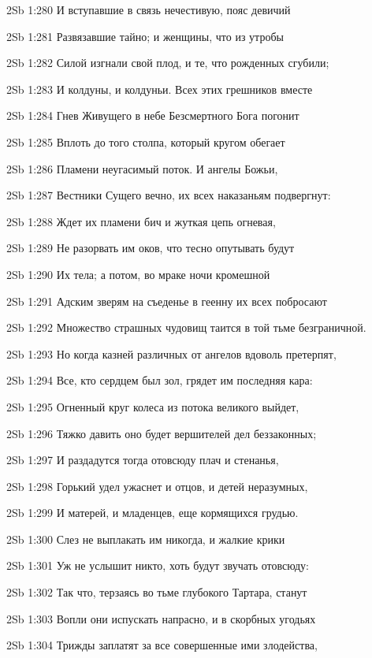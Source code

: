 \vs 2Sb 1:280 И вступавшие в связь нечестивую, пояс девичий 

\vs 2Sb 1:281 Развязавшие тайно; и женщины, что из утробы 

\vs 2Sb 1:282 Силой изгнали свой плод, и те, что рожденных сгубили; 

\vs 2Sb 1:283 И колдуны, и колдуньи. Всех этих грешников вместе 

\vs 2Sb 1:284 Гнев Живущего в небе Безсмертного Бога погонит

\vs 2Sb 1:285 Вплоть до того столпа, который кругом обегает 

\vs 2Sb 1:286 Пламени неугасимый поток. И ангелы Божьи, 

\vs 2Sb 1:287 Вестники Сущего вечно, их всех наказаньям подвергнут: 

\vs 2Sb 1:288 Ждет их пламени бич и жуткая цепь огневая,

\vs 2Sb 1:289 Не разорвать им оков, что тесно опутывать будут

\vs 2Sb 1:290 Их тела; а потом, во мраке ночи кромешной

\vs 2Sb 1:291 Адским зверям на съеденье в геенну их всех побросают  

\vs 2Sb 1:292 Множество страшных чудовищ таится в той тьме безграничной.

\vs 2Sb 1:293 Но когда казней различных от ангелов вдоволь претерпят, 

\vs 2Sb 1:294 Все, кто сердцем был зол, грядет им последняя кара:

\vs 2Sb 1:295 Огненный круг колеса из потока великого выйдет, 

\vs 2Sb 1:296 Тяжко давить оно будет вершителей дел беззаконных; 

\vs 2Sb 1:297 И раздадутся тогда отовсюду плач и стенанья, 

\vs 2Sb 1:298 Горький удел ужаснет и отцов, и детей неразумных, 

\vs 2Sb 1:299 И матерей, и младенцев, еще кормящихся грудью.

\vs 2Sb 1:300 Слез не выплакать им никогда, и жалкие крики 

\vs 2Sb 1:301 Уж не услышит никто, хоть будут звучать отовсюду: 

\vs 2Sb 1:302 Так что, терзаясь во тьме глубокого Тартара, станут 

\vs 2Sb 1:303 Вопли они испускать напрасно, и в скорбных угодьях 

\vs 2Sb 1:304 Трижды заплатят за все совершенные ими злодейства,

